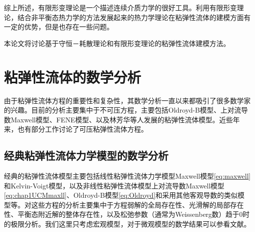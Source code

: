 综上所述，有限形变理论是一个描述连续介质力学的很好工具。利用有限形变理论，结合非平衡态热力学的方法发展起来的热力学理论在粘弹性流体的建模方面有一定的优势，但是也存在一些问题。

本论文将讨论基于守恒－耗散理论和有限形变理论的粘弹性流体建模方法。

\section{粘弹性流体的数学分析}
由于粘弹性流体方程的重要性和复杂性，其数学分析一直以来都吸引了很多数学家的兴趣\cite{lin2012some,li2007mathematical,weinan2002convergence,fabrizio1992mathematical,renardy2008mathematical,joseph1987hyperbolicity,guillope2010regular,saut2012lectures,yong2014newtonian,qian2010well,hu2011global,lei2005global,fang2014incompressible}。目前的分析主要集中于不可压方程，主要包括Oldroyd-B模型、上对流导数Maxwell模型、FENE模型、以及林芳华等人发展的粘弹性流体模型\cite{elgindi2015global,saut2012lectures,renardy2000mathematical,masmoudi2011global,lions2000global,masmoudi2008well,lei2010remarks}。近些年来，也有部分工作讨论了可压粘弹性流体方程\cite{fang2014incompressible,hu2012strong,qian2010global,qian2011initial}。
\subsection{经典粘弹性流体力学模型的数学分析}
经典的粘弹性流体模型主要包括线性粘弹性流体力学模型Maxwell模型\eqref{eq:maxwell}和Kelvin-Voigt模型，以及非线性粘弹性流体模型上对流导数Maxwell模型\eqref{eq:chap1UCMmaxll}、Oldroyd-B模型\eqref{eq:Oldroyd}和采用其他客观导数的类似模型等。对这些方程的分析主要集中于方程弱解的全局存在性、光滑解的局部存在性、平衡态附近解的整体存在性，以及松弛参数（通常为Weissenberg数）趋于$0$时的极限分析。我们这里只考虑宏观模型，对于微观模型的数学结果可以参看文献\cite{masmoudi2013global,masmoudi2008well,li2007mathematical,li2004local,li2004well,lions2007global}。

